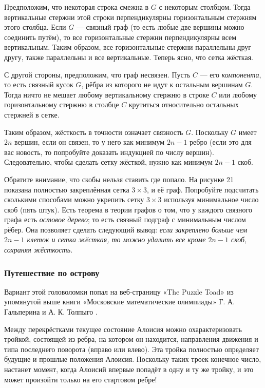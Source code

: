 Предположим, что некоторая строка смежна в $G$ с некоторым столбцом.
Тогда вертикальные стержни этой строки перпендикулярны горизонтальным стержням этого столбца.
Если $G$ --- связный граф (то есть любые две вершины можно соединить путём), то все горизонтальные стержни перпендикулярны всем вертикальным.
Таким образом, все горизонтальные стержни параллельны друг другу,
также параллельны и все вертикальные.
Теперь ясно, что сетка жёсткая.

С другой стороны, предположим, что граф несвязен.
Пусть $C$ --- его \emph{компонента}, то есть связный кусок $G$, рёбра из которого не идут к остальным вершинам $G$.
Тогда ничто не мешает любому вертикальному стержню в строке $C$ или любому горизонтальному стержню в столбце $C$ крутиться относительно остальных стержней в сетке.

Таким образом, жёсткость в точности означает связность $G$.
Поскольку $G$ имеет $2n$ вершин, если он связен, то у него как минимум $2n - 1$ ребро
(если это для вас новость, то попробуйте доказать индукцией по числу вершин).
Следовательно, чтобы сделать сетку жёсткой, нужно как минимум $2n - 1$ скоб.

Обратите внимание, что скобы нельзя ставить где попало.
На рисунке 21 показана полностью закреплённая сетка $3 \times 3$, и её граф.
Попробуйте подсчитать сколькими способами можно укрепить сетку $3 \times 3$ используя минимальное число скоб  (пять штук).
Есть теорема в теории графов о том, что у каждого связного графа есть \emph{остовое дерево}; то есть связный подграф с минимальным числом рёбер.
Она позволяет сделать следующий вывод: \emph{если закреплено больше чем $2n - 1$ клеток и сетка жёсткая, то можно удалить все кроме $2n - 1$ скоб, сохраняя жёсткость.}

\subsubsection*{Путешествие по острову}

Вариант этой головоломки попал на веб-страницу «The Puzzle Toad» \cite{bohman-pikhurko-frieze-sleator} из упомянутой выше книги «Московские математические олимпиады» Г. А. Гальперина и А. К. Толпыго \cite{23}.

Между перекрёстками текущее состояние Алоисия можно охарактеризовать тройкой, состоящей из ребра, на котором он находится, направления движения и типа последнего поворота (вправо или влево).
Эта тройка полностью определяет будущие и прошлые положения Алоисия.
Поскольку таких троек конечное число, настанет момент, когда Алоисий впервые попадёт в одну и ту же тройку, и это может произойти только на его стартовом ребре!

